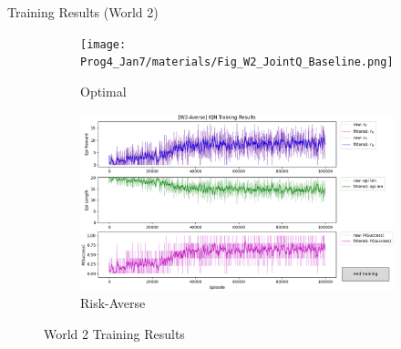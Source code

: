\documentclass[aspectratio=1610, xcolor=dvipsnames]{packages/beamer}
\begin{document}
\begin{frame}{Training Results (World 2)}
     \begin{figure}
     \centering
          \begin{subfigure}[b]{\Wfig\textwidth}  \centering
              \texttt{[image: Prog4\_Jan7/materials/Fig\_W2\_JointQ\_Baseline.png]}
              \caption{Optimal} \label{fig:W2baseline}
          \end{subfigure}
          \hfill
         \begin{subfigure}[b]{\Wfig\textwidth} \centering
             \includegraphics[width=\textwidth]{../results/IDQN_W2/Fig_W2_JointQ_Averse}
             \caption{Risk-Averse} \label{fig:W2averse}
         \end{subfigure}
    \caption{World 2 Training Results}
    \label{fig:W2}
    \end{figure}
\end{frame}
\end{document}
